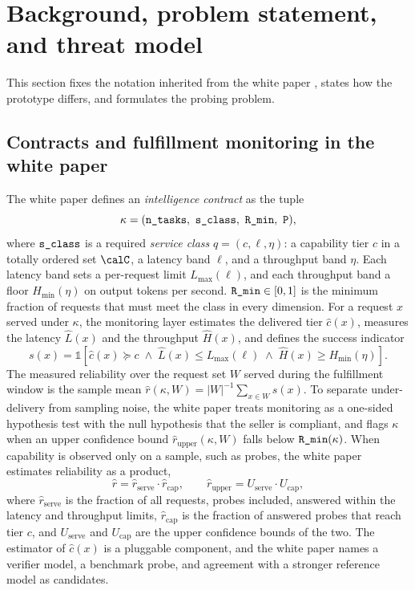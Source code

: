 \section{Background, problem statement, and threat model}
\label{sec:background}

This section fixes the notation inherited from the white paper
\cite{noesis_whitepaper}, states how the prototype differs, and formulates
the probing problem.

\subsection{Contracts and fulfillment monitoring in the white paper}
\label{sec:background_whitepaper}

The white paper defines an \emph{intelligence contract} as the tuple
$$
  \kappa = (\ntasksattr,\ \sclassattr,\ \rminattr,\ \priceattr),
$$
where $\textnormal{\texttt{s\_class}}$ is a required \emph{service class}
$q = (c, \ell, \eta)$: a capability tier $c$ in a totally ordered set $\calC$,
a latency band $\ell$, and a throughput band $\eta$. Each latency band sets a
per-request limit $L_{\max}(\ell)$, and each throughput band a floor
$H_{\min}(\eta)$ on output tokens per second. $\textnormal{\texttt{R\_min}} \in [0,1]$ is the
minimum fraction of requests that must meet the class in every dimension. For
a request $x$ served under $\kappa$, the monitoring layer estimates the
delivered tier $\hat c(x)$, measures the latency $\hat L(x)$ and the
throughput $\hat H(x)$, and defines the success indicator
\begin{equation}
  \label{eq:wp_success}
  s(x) = \mathbb{1}\!\left[\hat c(x) \succeq c
    \;\wedge\; \hat L(x) \leq L_{\max}(\ell)
    \;\wedge\; \hat H(x) \geq H_{\min}(\eta)\right].
\end{equation}
The measured reliability over the request set $W$ served during the
fulfillment window is the sample mean $\hat r(\kappa, W) = |W|^{-1}\sum_{x\in W}
s(x)$. To separate under-delivery from sampling noise, the white paper treats
monitoring as a one-sided hypothesis test with the null hypothesis that the
seller is compliant, and flags $\kappa$ when an upper confidence bound
$\hat r_{\text{upper}}(\kappa, W)$ falls below $\textnormal{\texttt{R\_min}}(\kappa)$. When
capability is observed only on a sample, such as probes, the white paper
estimates reliability as a product,
\begin{equation}
  \label{eq:wp_product}
  \hat r = \hat r_{\text{serve}} \cdot \hat r_{\text{cap}},
  \qquad
  \hat r_{\text{upper}} = U_{\text{serve}} \cdot U_{\text{cap}},
\end{equation}
where $\hat r_{\text{serve}}$ is the fraction of all requests, probes included,
answered within the latency and throughput limits, $\hat r_{\text{cap}}$ is
the fraction of answered probes that reach tier $c$, and $U_{\text{serve}}$ and
$U_{\text{cap}}$ are the upper confidence bounds of the two. The estimator of
$\hat c(x)$ is a pluggable component, and the white paper names a verifier
model, a benchmark probe, and agreement with a stronger reference model as
candidates.

